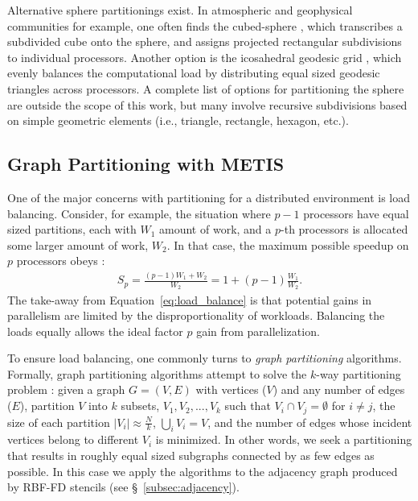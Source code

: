 \documentclass{report}
\begin{document}
Alternative sphere partitionings exist. In atmospheric and geophysical communities for example, one often finds the cubed-sphere \cite{Ivan2011, Katta2012}, which transcribes a subdivided cube onto the sphere, and assigns projected rectangular subdivisions to individual processors. Another option is the icosahedral geodesic grid \cite{Randall2002}, which evenly balances the computational load by distributing equal sized geodesic triangles across processors. A complete list of options for partitioning the sphere are outside the scope of this work, but many involve recursive subdivisions based on simple geometric elements (i.e., triangle, rectangle, hexagon, etc.). 


\subsection{Graph Partitioning with METIS}

One of the major concerns with partitioning for a distributed environment is load balancing. Consider, for example, the situation where $p-1$ processors have equal sized partitions, each with $W_1$ amount of work, and a $p$-th processors is allocated some larger amount of work, $W_2$. In that case, the maximum possible speedup on $p$ processors obeys \cite{Gropp1990}:  
\begin{align}
S_p = \frac{(p-1) W_1 + W_2}{W_2} = 1 + (p-1)\frac{W_1}{W_2}.
\label{eq:load_balance}
\end{align}
The take-away from Equation~\ref{eq:load_balance} is that potential gains in parallelism are limited by the disproportionality of workloads. Balancing the loads equally allows the ideal factor $p$ gain from parallelization. 

To ensure load balancing, one commonly turns to \emph{graph partitioning} algorithms. Formally, graph partitioning algorithms attempt to solve the $k$-way partitioning problem \cite{Karypis1999}: given a graph $G = (V,E)$ with vertices ($V$) and any number of edges ($E$), partition $V$ into $k$ subsets, $V_1, V_2, ..., V_k$ such that $V_i \cap V_j = \emptyset$ for $i \neq j$, the size of each partition $|V_i| \approx \frac{N}{k}$, $\bigcup_i V_i = V$, and the number of edges whose incident vertices belong to different $V_i$ is minimized. In other words, we seek a partitioning that results in roughly equal sized subgraphs connected by as few edges as possible. In this case we apply the algorithms to the adjacency graph produced by RBF-FD stencils (see \S~\ref{subsec:adjacency}).
\end{document}
